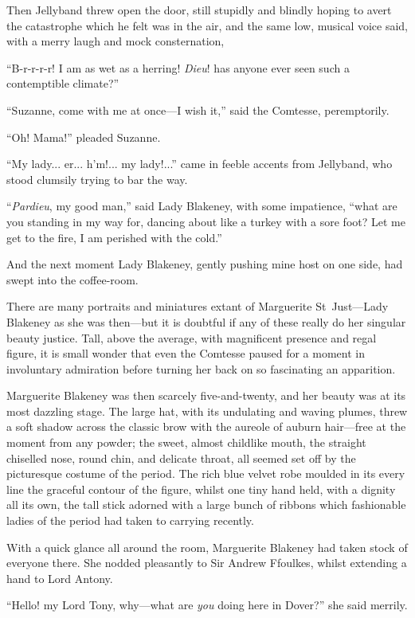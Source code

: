 Then Jellyband threw open the door, still stupidly and blindly hoping to avert the catastrophe which he felt was in the air, and the same low, musical voice said, with a merry laugh and mock consternation,\longdash


\enquote{B-r-r-r-r! I am as wet as a herring! \textit{Dieu}! has anyone ever seen such a contemptible climate?}

\enquote{Suzanne, come with me at once---I wish it,} said the Comtesse, peremptorily.

\enquote{Oh! Mama!} pleaded Suzanne.

\enquote{My lady... er... h'm!... my lady!...} came in feeble accents from Jellyband, who stood clumsily trying to bar the way.

\enquote{\textit{Pardieu}, my good man,} said Lady Blakeney, with some impatience, \enquote{what are you standing in my way for, dancing about like a turkey with a sore foot? Let me get to the fire, I am perished with the cold.}

And the next moment Lady Blakeney, gently pushing mine host on one side, had swept into the coffee-room.

There are many portraits and miniatures extant of Marguerite St~Just---Lady Blakeney as she was then---but it is doubtful if any of these really do her singular beauty justice. Tall, above the average, with magnificent presence and regal figure, it is small wonder that even the Comtesse paused for a moment in involuntary admiration before turning her back on so fascinating an apparition.

Marguerite Blakeney was then scarcely five-and-twenty, and her beauty was at its most dazzling stage. The large hat, with its undulating and waving plumes, threw a soft shadow across the classic brow with the aureole of auburn hair---free at the moment from any powder; the sweet, almost childlike mouth, the straight chiselled nose, round chin, and delicate throat, all seemed set off by the picturesque costume of the period. The rich blue velvet robe moulded in its every line the graceful contour of the figure, whilst one tiny hand held, with a dignity all its own, the tall stick adorned with a large bunch of ribbons which fashionable ladies of the period had taken to carrying recently.

With a quick glance all around the room, Marguerite Blakeney had taken stock of everyone there. She nodded pleasantly to Sir Andrew Ffoulkes, whilst extending a hand to Lord Antony.

\enquote{Hello! my Lord Tony, why---what are \textit{you} doing here in Dover?} she said merrily.

